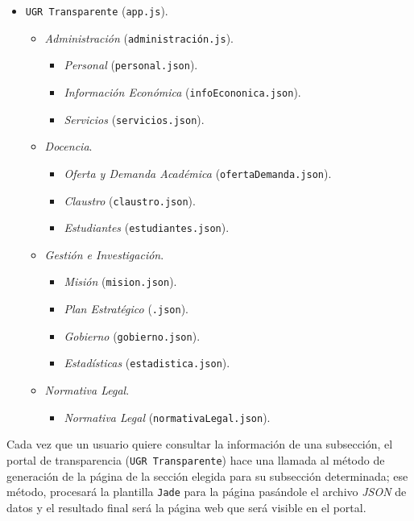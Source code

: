 \newpage
\begin{itemize}
 \item {\tt UGR Transparente} ({\tt app.js}).
 \begin{itemize}
  \item \textit{Administración} ({\tt administración.js}).
  \begin{itemize}
   \item \textit{Personal} ({\tt personal.json}).
   \item \textit{Información Económica} ({\tt infoEcononica.json}).
   \item \textit{Servicios} ({\tt servicios.json}).
  \end{itemize}
  \item \textit{Docencia}.
  \begin{itemize}
   \item \textit{Oferta y Demanda Académica} ({\tt ofertaDemanda.json}).
   \item \textit{Claustro} ({\tt claustro.json}).
   \item \textit{Estudiantes} ({\tt estudiantes.json}).
  \end{itemize}
  \item \textit{Gestión e Investigación}.
  \begin{itemize}
   \item \textit{Misión} ({\tt mision.json}).
   \item \textit{Plan Estratégico} ({\tt .json}).
   \item \textit{Gobierno} ({\tt gobierno.json}).
   \item \textit{Estadísticas} ({\tt estadistica.json}).
  \end{itemize}
  \item \textit{Normativa Legal}.
  \begin{itemize}
   \item \textit{Normativa Legal} ({\tt normativaLegal.json}).
  \end{itemize}
 \end{itemize}
\end{itemize}

Cada vez que un usuario quiere consultar la información de una subsección, el portal de transparencia ({\tt UGR Transparente}) hace una llamada al método de generación de la página de la sección elegida para su subsección determinada; ese método, procesará la plantilla {\tt Jade} para la página pasándole el archivo \textit{JSON} de datos y el resultado final será la página web que será visible en el portal.

